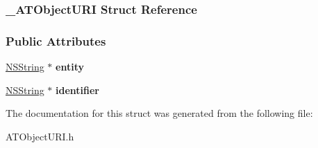 \hypertarget{struct___a_t_object_u_r_i}{
\subsubsection{\_\-ATObjectURI Struct Reference}
\label{struct___a_t_object_u_r_i}
}
\subsubsection*{Public Attributes}
\begin{DoxyCompactItemize}
\item 
\hypertarget{struct___a_t_object_u_r_i_a868f797198138714f1e35d12a2bbf204}{
\hyperlink{class_n_s_string}{NSString} $\ast$ {\bfseries entity}}
\label{struct___a_t_object_u_r_i_a868f797198138714f1e35d12a2bbf204}

\item 
\hypertarget{struct___a_t_object_u_r_i_a3a07f6f3a3a48e6a0802f6cc0c3b6fac}{
\hyperlink{class_n_s_string}{NSString} $\ast$ {\bfseries identifier}}
\label{struct___a_t_object_u_r_i_a3a07f6f3a3a48e6a0802f6cc0c3b6fac}

\end{DoxyCompactItemize}


The documentation for this struct was generated from the following file:\begin{DoxyCompactItemize}
\item 
ATObjectURI.h\end{DoxyCompactItemize}
